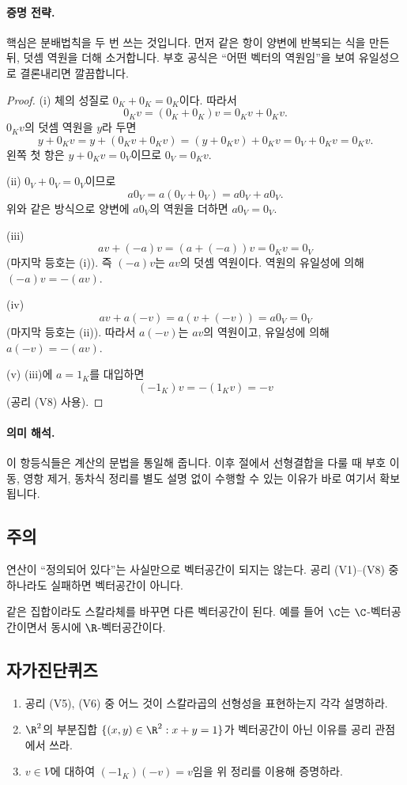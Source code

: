 \paragraph{증명 전략.}
핵심은 분배법칙을 두 번 쓰는 것입니다. 먼저 같은 항이 양변에 반복되는 식을 만든 뒤, 덧셈 역원을 더해 소거합니다. 부호 공식은 ``어떤 벡터의 역원임''을 보여 유일성으로 결론내리면 깔끔합니다.

\begin{proof}
(i) 체의 성질로 $0_K+0_K=0_K$이다. 따라서
\[
0_Kv=(0_K+0_K)v=0_Kv+0_Kv.
\]
$0_Kv$의 덧셈 역원을 $y$라 두면
\[
y+0_Kv=y+(0_Kv+0_Kv)=(y+0_Kv)+0_Kv=0_V+0_Kv=0_Kv.
\]
왼쪽 첫 항은 $y+0_Kv=0_V$이므로 $0_V=0_Kv$.

(ii) $0_V+0_V=0_V$이므로
\[
a0_V=a(0_V+0_V)=a0_V+a0_V.
\]
위와 같은 방식으로 양변에 $a0_V$의 역원을 더하면 $a0_V=0_V$.

(iii)
\[
av+(-a)v=(a+(-a))v=0_Kv=0_V
\]
(마지막 등호는 (i)). 즉 $(-a)v$는 $av$의 덧셈 역원이다. 역원의 유일성에 의해 $(-a)v=-(av)$.

(iv)
\[
av+a(-v)=a(v+(-v))=a0_V=0_V
\]
(마지막 등호는 (ii)). 따라서 $a(-v)$는 $av$의 역원이고, 유일성에 의해 $a(-v)=-(av)$.

(v) (iii)에 $a=1_K$를 대입하면
\[
(-1_K)v=-(1_Kv)= -v
\]
(공리 (V8) 사용).
\end{proof}

\paragraph{의미 해석.}
이 항등식들은 계산의 문법을 통일해 줍니다. 이후 절에서 선형결합을 다룰 때 부호 이동, 영항 제거, 동차식 정리를 별도 설명 없이 수행할 수 있는 이유가 바로 여기서 확보됩니다.

\subsection*{주의}
\begin{warning}
연산이 ``정의되어 있다''는 사실만으로 벡터공간이 되지는 않는다. 공리 (V1)--(V8) 중 하나라도 실패하면 벡터공간이 아니다.
\end{warning}
\begin{warning}
같은 집합이라도 스칼라체를 바꾸면 다른 벡터공간이 된다. 예를 들어 $\C$는 $\C$-벡터공간이면서 동시에 $\R$-벡터공간이다.
\end{warning}

\subsection*{자가진단퀴즈}
\begin{enumerate}[label=\arabic*.]
\item 공리 (V5), (V6) 중 어느 것이 스칼라곱의 선형성을 표현하는지 각각 설명하라.
\item $\R^2$의 부분집합 $\{(x,y)\in\R^2:x+y=1\}$가 벡터공간이 아닌 이유를 공리 관점에서 쓰라.
\item $v\in V$에 대하여 $(-1_K)(-v)=v$임을 위 정리를 이용해 증명하라.
\end{enumerate}


